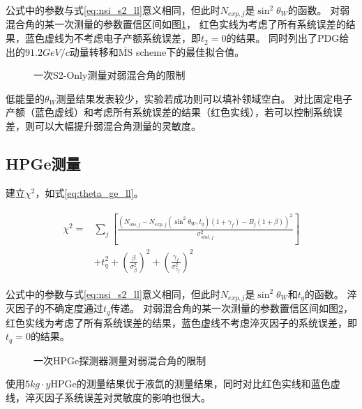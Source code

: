 公式中的参数与式\ref{eq:nsi_s2_ll}意义相同，但此时$N_{exp,j}$是$\sin^2\theta_W$的函数。
对弱混合角的某一次测量的参数置信区间如图\ref{fig:thetaw_sensitivity_s2only}，
红色实线为考虑了所有系统误差的结果，蓝色虚线为不考虑电子产额系统误差，即$t_2=0$的结果。
同时列出了PDG给出的$91.2\si{GeV/c}$动量转移和$\overline{\mathrm{MS}}$ scheme下的最佳拟合值\cite{particle_data_group_review_2020}。

\begin{figure}
  \centering
  
  \caption{\label{fig:thetaw_sensitivity_s2only} 一次S2-Only测量对弱混合角的限制}
\end{figure}

低能量的$\theta_W$测量结果发表较少，实验若成功则可以填补领域空白。
对比固定电子产额（蓝色虚线）和考虑所有系统误差的结果（红色实线），若可以控制系统误差，则可以大幅提升弱混合角测量的灵敏度。

\subsection{HPGe测量}

建立$\chi^2$，如式\ref{eq:theta_ge_ll}。

\begin{align}
    \label{eq:theta_ge_ll}
    \begin{split}
    \chi^2 =& \sum_j\left[\frac{\left(N_{obs,j} - N_{exp,j}(\sin^2\theta_W, t_q)(1 + \gamma_f) 
    - B_{j}(1 + \beta)\right)^2}{\sigma^2_{stat,j}}\right] \\
    & + t_q^2 + (\frac{\beta}{\sigma^2_{\beta}})^2 + (\frac{\gamma_f}{\sigma^2_{\gamma_f}})^2
    \end{split}
\end{align}

公式中的参数与式\ref{eq:nsi_s2_ll}意义相同，但此时$N_{exp,j}$是$\sin^2\theta_W$和$t_q$的函数。
淬灭因子的不确定度通过$t_q$传递。
对弱混合角的某一次测量的参数置信区间如图\ref{fig:thetaw_sensitivity_ge}，
红色实线为考虑了所有系统误差的结果，蓝色虚线不考虑淬灭因子的系统误差，即$t_q=0$的结果。

\begin{figure}
    \centering
    
    \caption{\label{fig:thetaw_sensitivity_ge} 一次HPGe探测器测量对弱混合角的限制}
\end{figure}

使用$5\si{kg\cdot y}$HPGe的测量结果优于液氙的测量结果，同时对比红色实线和蓝色虚线，淬灭因子系统误差对灵敏度的影响也很大。

